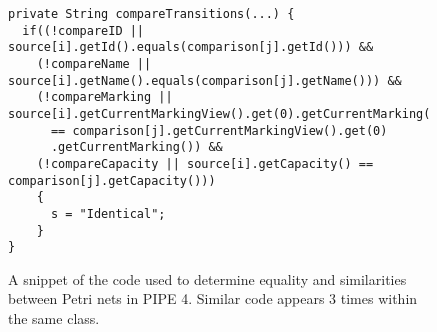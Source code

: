 \begin{figure}[H]
\begin{center}
\begin{lstlisting}[frame=single]
private String compareTransitions(...) {
  if((!compareID || source[i].getId().equals(comparison[j].getId())) &&
    (!compareName || source[i].getName().equals(comparison[j].getName())) &&
    (!compareMarking || source[i].getCurrentMarkingView().get(0).getCurrentMarking()
      == comparison[j].getCurrentMarkingView().get(0)
      .getCurrentMarking()) &&
    (!compareCapacity || source[i].getCapacity() == comparison[j].getCapacity()))
    {
      s = "Identical";
    }
}
\end{lstlisting}
  
\caption{A snippet of the code used to determine equality and similarities between
            Petri nets in PIPE 4. Similar code appears 3 times within the same class.}
\label{lst:identical}
\end{center}
\end{figure}